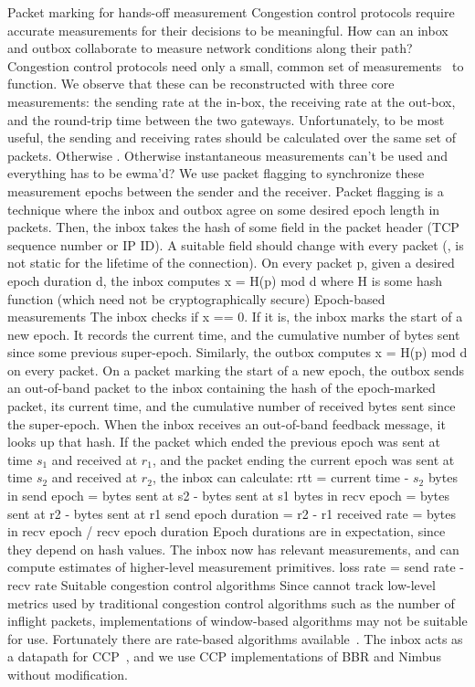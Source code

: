 \begin{outline}
\1 Packet marking for hands-off measurement
    \2 Congestion control protocols require accurate measurements for their decisions to be meaningful. How can an inbox and outbox collaborate to measure network conditions along their path?
    \2 Congestion control protocols need only a small, common set of measurements~\cite{ccp-hotnets} to function. We observe that these can be reconstructed with three core measurements: the sending rate at the in-box, the receiving rate at the out-box, and the round-trip time between the two gateways.
    \2 Unfortunately, to be most useful, the sending and receiving rates should be calculated over the same set of packets. Otherwise .
        \3 Otherwise instantaneous measurements can't be used and everything has to be ewma'd?
    \2 We use packet flagging to synchronize these measurement epochs between the sender and the receiver.
    \2 Packet flagging is a technique where the inbox and outbox agree on some desired epoch length in packets.
    \2 Then, the inbox takes the hash of some field in the packet header (\eg TCP sequence number or IP ID).   
        \3 A suitable field should change with every packet (\ie, is not static for the lifetime of the connection).
        \3 On every packet p, given a desired epoch duration d, the inbox computes x = H(p) mod d where H is some hash function (which need not be cryptographically secure)
    \2 Epoch-based measurements
        \3 The inbox checks if x == 0. If it is, the inbox marks the start of a new epoch. It records the current time, and the cumulative number of bytes sent since some previous super-epoch.
        \3 Similarly, the outbox computes x = H(p) mod d on every packet. On a packet marking the start of a new epoch, the outbox sends an out-of-band packet to the inbox containing the hash of the epoch-marked packet, its current time, and the cumulative number of received bytes sent since the super-epoch.
        \3 When the inbox receives an out-of-band feedback message, it looks up that hash. If the packet which ended the previous epoch was sent at time $s_1$ and received at $r_1$, and the packet ending the current epoch was sent at time $s_2$ and received at $r_2$, the inbox can calculate:
            \4 rtt = current time - $s_2$
            \4 bytes in send epoch = bytes sent at s2 - bytes sent at s1
            \4 bytes in recv epoch = bytes sent at r2 - bytes sent at r1
            \4 send epoch duration = r2 - r1
            \4 received rate = bytes in recv epoch / recv epoch duration
        \3 Epoch durations are in expectation, since they depend on hash values.
    \2 The inbox now has relevant measurements, and can compute estimates of higher-level measurement primitives.
        \3 \eg loss rate = send rate - recv rate
\1 Suitable congestion control algorithms
    \2 Since \name cannot track low-level metrics used by traditional congestion control algorithms such as the number of inflight packets, implementations of window-based algorithms may not be suitable for use.
    \2 Fortunately there are rate-based algorithms available~\cite{bbr, nimbus}.
    \2 The inbox acts as a datapath for CCP~\cite{ccp}, and we use CCP implementations of BBR and Nimbus without modification.
\end{outline}